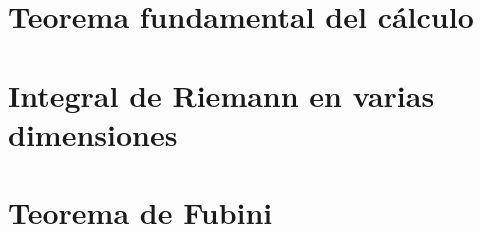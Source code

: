 \section{Teorema fundamental del cálculo}

\section{Integral de Riemann en varias dimensiones}

\section{Teorema de Fubini}
